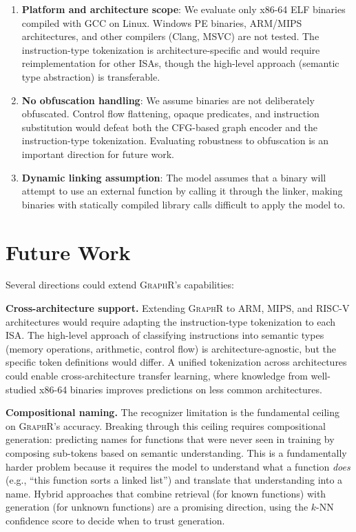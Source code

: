 \documentclass[sigconf,nonacm]{acmart}
\newcommand{\sysname}{\textsc{GraphR}}
\begin{document}
\begin{enumerate}
    \item \textbf{Platform and architecture scope}: We evaluate only x86-64 ELF binaries compiled with GCC on Linux. Windows PE binaries, ARM/MIPS architectures, and other compilers (Clang, MSVC) are not tested. The instruction-type tokenization is architecture-specific and would require reimplementation for other ISAs, though the high-level approach (semantic type abstraction) is transferable.

    \item \textbf{No obfuscation handling}: We assume binaries are not deliberately obfuscated. Control flow flattening, opaque predicates, and instruction substitution would defeat both the CFG-based graph encoder and the instruction-type tokenization. Evaluating robustness to obfuscation is an important direction for future work.

    \item \textbf{Dynamic linking assumption}: The model assumes that a binary will attempt to use an external function by calling it through the linker, making binaries with statically compiled library calls difficult to apply the model to.
\end{enumerate}

\section{Future Work}
\label{sec:future}

Several directions could extend \sysname{}'s capabilities:

\textbf{Cross-architecture support.} Extending \sysname{} to ARM, MIPS, and RISC-V architectures would require adapting the instruction-type tokenization to each ISA. The high-level approach of classifying instructions into semantic types (memory operations, arithmetic, control flow) is architecture-agnostic, but the specific token definitions would differ. A unified tokenization across architectures could enable cross-architecture transfer learning, where knowledge from well-studied x86-64 binaries improves predictions on less common architectures.

\textbf{Compositional naming.} The recognizer limitation is the fundamental ceiling on \sysname{}'s accuracy. Breaking through this ceiling requires compositional generation: predicting names for functions that were never seen in training by composing sub-tokens based on semantic understanding. This is a fundamentally harder problem because it requires the model to understand what a function \emph{does} (e.g., ``this function sorts a linked list'') and translate that understanding into a name. Hybrid approaches that combine retrieval (for known functions) with generation (for unknown functions) are a promising direction, using the $k$-NN confidence score to decide when to trust generation.
\end{document}
